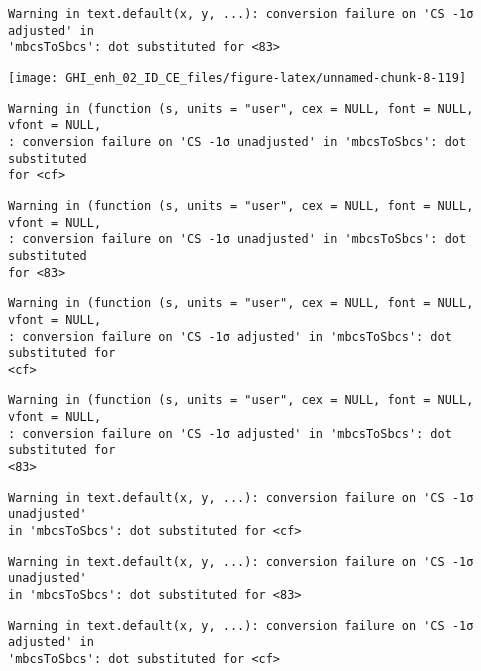 \documentclass[
  10pt,
  a4paper,oneside]{article}
\begin{document}
\begin{verbatim}
Warning in text.default(x, y, ...): conversion failure on 'CS -1σ adjusted' in
'mbcsToSbcs': dot substituted for <83>
\end{verbatim}

\begin{center}\texttt{[image: GHI\_enh\_02\_ID\_CE\_files/figure-latex/unnamed-chunk-8-119]} \end{center}

\begin{verbatim}
Warning in (function (s, units = "user", cex = NULL, font = NULL, vfont = NULL,
: conversion failure on 'CS -1σ unadjusted' in 'mbcsToSbcs': dot substituted
for <cf>
\end{verbatim}

\begin{verbatim}
Warning in (function (s, units = "user", cex = NULL, font = NULL, vfont = NULL,
: conversion failure on 'CS -1σ unadjusted' in 'mbcsToSbcs': dot substituted
for <83>
\end{verbatim}

\begin{verbatim}
Warning in (function (s, units = "user", cex = NULL, font = NULL, vfont = NULL,
: conversion failure on 'CS -1σ adjusted' in 'mbcsToSbcs': dot substituted for
<cf>
\end{verbatim}

\begin{verbatim}
Warning in (function (s, units = "user", cex = NULL, font = NULL, vfont = NULL,
: conversion failure on 'CS -1σ adjusted' in 'mbcsToSbcs': dot substituted for
<83>
\end{verbatim}

\begin{verbatim}
Warning in text.default(x, y, ...): conversion failure on 'CS -1σ unadjusted'
in 'mbcsToSbcs': dot substituted for <cf>
\end{verbatim}

\begin{verbatim}
Warning in text.default(x, y, ...): conversion failure on 'CS -1σ unadjusted'
in 'mbcsToSbcs': dot substituted for <83>
\end{verbatim}

\begin{verbatim}
Warning in text.default(x, y, ...): conversion failure on 'CS -1σ adjusted' in
'mbcsToSbcs': dot substituted for <cf>
\end{verbatim}
\end{document}
